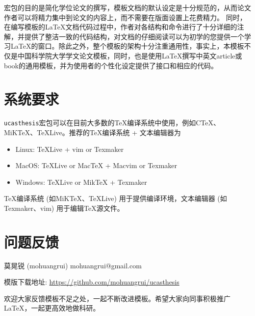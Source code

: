 宏包的目的是简化学位论文的撰写，模板文档的默认设定是十分规范的，从而论文作者可以将精力集中到论文的内容上，而不需要在版面设置上花费精力。 同时，在编写模板的\LaTeX{}文档代码过程中，作者对各结构和命令进行了十分详细的注解，并提供了整洁一致的代码结构，对文档的仔细阅读可以为初学的您提供一个学习\LaTeX{}的窗口。除此之外，整个模板的架构十分注重通用性，事实上，本模板不仅是中国科学院大学学文论文模板，同时，也是使用\LaTeX{}撰写中英文article或book的通用模板，并为使用者的个性化设定提供了接口和相应的代码。

\section{系统要求}

\texttt{ucasthesis}宏包可以在目前大多数的\TeX{}编译系统中使用，例如C\TeX{}、MiK\TeX{}、\TeX{}Live。推荐的\TeX{}编译系统 + 文本编辑器为
\begin{itemize}
    \item Linux: \TeX{}Live + vim or Texmaker
    \item MacOS: \TeX{}Live or Mac\TeX{} + Macvim or Texmaker
    \item Windows: \TeX{}Live or Mik\TeX{}  + Texmaker
\end{itemize}
\TeX{}编译系统 (如MiK\TeX{}、\TeX{}Live) 用于提供编译环境，文本编辑器 (如Texmaker、vim) 用于编辑\TeX{}源文件。

\section{问题反馈}

\begin{center}
莫晃锐 (mohuangrui) \quad mohuangrui@gmail.com

模版下载地址: \url{https://github.com/mohuangrui/ucasthesis}
\end{center}

欢迎大家反馈模板不足之处，一起不断改进模板。希望大家向同事积极推广\LaTeX{}，一起更高效地做科研。
